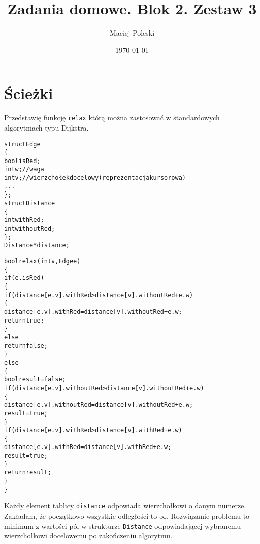 \documentclass[a4paper,12pt]{article}
\title{Zadania domowe. Blok 2. Zestaw 3}
\author{Maciej Poleski}
\date{\today}
\begin{document}
\maketitle

\newpage

\section{Ścieżki}
Przedstawię funkcję \verb|relax| którą można zastosować w standardowych algorytmach typu Dijkstra.
\begin{alltt}
 struct Edge
 \{
     bool isRed;
     int w;  // waga
     int v;  // wierzchołek docelowy (reprezentacja kursorowa)
      ...
 \};
 struct Distance
 \{
     int withRed;
     int withoutRed;
 \};
 Distance *distance;
 
 bool relax(int v, Edge e)
 \{
     if(e.isRed)
     \{
         if(distance[e.v].withRed>distance[v].withoutRed+e.w)
         \{
             distance[e.v].withRed=distance[v].withoutRed+e.w;
             return true;
         \}
         else
             return false;
     \}
     else
     \{
         bool result=false;
         if(distance[e.v].withoutRed>distance[v].withoutRed+e.w)
         \{
             distance[e.v].withoutRed=distance[v].withoutRed+e.w;
             result=true;
         \}
         if(distance[e.v].withRed>distance[v].withRed+e.w)
         \{
             distance[e.v].withRed=distance[v].withRed+e.w;
             result=true;
         \}
         return result;
     \}
 \}
\end{alltt}
Każdy element tablicy \verb|distance| odpowiada wierzchołkowi o danym numerze. Zakładam, że początkowo wszystkie odległości to $\infty$. Rozwiązanie problemu to minimum z wartości pól w strukturze \verb|Distance| odpowiadającej wybranemu wierzchołkowi docelowemu po zakończeniu algorytmu.
\end{document}
